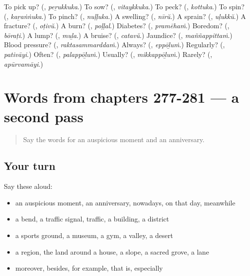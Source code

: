 \begin{tcolorbox}[breakable,colback=teal!4,colframe=teal!35!black,title={Before you move on}]
To pick up? (\textbf{}, \emph{peṟukkuka}.) To sow? (\textbf{}, \emph{vitaykkuka}.) To peck? (\textbf{}, \emph{kottuka}.) To spin? (\textbf{}, \emph{kaṟaṅṅuka}.) To pinch? (\textbf{}, \emph{nuḷḷuka}.) A swelling? (\textbf{}, \emph{nīrŭ}.) A sprain? (\textbf{}, \emph{uḷukkŭ}.) A fracture? (\textbf{}, \emph{oṭivŭ}.) A burn? (\textbf{}, \emph{poḷḷal}.) Diabetes? (\textbf{}, \emph{pramēhaṁ}.) Boredom? (\textbf{}, \emph{bōraṭi}.) A lump? (\textbf{}, \emph{muḻa}.) A bruise? (\textbf{}, \emph{catavŭ}.) Jaundice? (\textbf{}, \emph{maññappittaṁ}.) Blood pressure? (\textbf{}, \emph{raktasammarddaṁ}.) Always? (\textbf{}, \emph{eppōḻuṁ}.) Regularly? (\textbf{}, \emph{pativāyi}.) Often? (\textbf{}, \emph{palappōḻuṁ}.) Usually? (\textbf{}, \emph{mikkappōḻuṁ}.) Rarely? (\textbf{}, \emph{apūrvamāyi}.)
\end{tcolorbox}
\section[(dialogue)]{Words from chapters 277-281 — a second pass}

\label{lesson:ML-R281-second-pass-words-from-chapters-277-281}



\begin{quote}
Say the words for an auspicious moment and an anniversary.
\end{quote}

\subsection*{Your turn}
Say these aloud:

\begin{itemize}
\raggedright
  \item an auspicious moment, an anniversary, nowadays, on that day, meanwhile
  \item a bend, a traffic signal, traffic, a building, a district
  \item a sports ground, a museum, a gym, a valley, a desert
  \item a region, the land around a house, a slope, a sacred grove, a lane
  \item moreover, besides, for example, that is, especially
\end{itemize}

